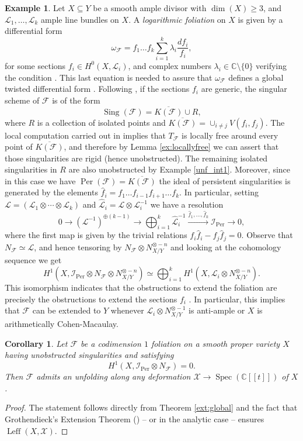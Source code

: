 \documentclass[reqno]{amsart}
\theoremstyle{plain}
\newcommand\C{\mathbb{C}}
\newcommand{\I}{\mathcal{I}}
\renewcommand{\I}{\mathcal{I}}
\renewcommand{\L}{\mathcal{L}}
\newcommand{\X}{\mathcal{X}}
\newcommand{\F}{\mathscr{F}}
\DeclareMathOperator{\Spec}{Spec}
\DeclareMathOperator{\Sing}{Sing}
\DeclareMathOperator{\Per}{Per}
\DeclareMathOperator{\Leff}{Leff}
\newcounter{Theorem}
\newtheorem{corollary}[theorem]{Corollary}
\theoremstyle{definition}
\newtheorem{example}[theorem]{Example}
\theoremstyle{named}
\begin{document}
\begin{example}
    Let $X\subseteq Y$ be a smooth ample divisor with $\dim(X)\geqslant 3$, and $\L_1,\dots, \L_k$ ample line bundles on $X$. A \emph{logarithmic foliation} on $X$ is given by a differential form
    $$ \omega_\F= f_1\dots f_k\sum_{i=1}^k \lambda_i \frac{df_i}{f_i},$$
    for some sections $f_i\in H^0(X,\L_i)$, and complex numbers $\lambda_i\in\C\setminus\{0\}$ verifying the condition \smash{$\sum_{i=1}^k \lambda_k c_1(\L_k) = 0$}. This last equation is needed to assure that $\omega_\F$ defines a global twisted differential form \cite[p. 752]{calvo1994irreducible}. Following \cite{cukierman2006singularities}, if the sections $f_i$ are generic, the singular scheme of $\F$ is  of the form 
    $$\Sing(\F)=\overline{K(\F)} \cup R,$$
    where $R$ is a collection of isolated points and $\overline{K(\F)}=\cup_{i\neq j} V(f_i,f_j)$.
    The local computation carried out in \cite[p. 134]{cukierman2006singularities} implies that $T_\F$ is locally free around every point of $\overline{K(\F)}$, and therefore by Lemma \ref{ex:locallyfree} we can assert that those singularities are rigid (hence unobstructed). The remaining isolated singularities in $R$ are also unobstructed by Example \ref{unf_int1}. Moreover, since in this case we have $\Per(\F)=\overline{K(\F)}$ the ideal of persistent singularities is generated by the elements $\widehat{f}_i=f_1\dots f_{i-1}f_{i+1}\dots f_k$. In particular, setting $\L=(\L_1\otimes \cdots \otimes \L_k)$ and $\widehat{\L}_i=\L\otimes \L_i^{-1}$ we have a resolution
    $$ 0 \rightarrow (\L^{-1})^{\oplus (k-1)} \longrightarrow \bigoplus_{i=1}^k \widehat{\L}_i^{ -1} \xrightarrow{\widehat{f}_1,\dots ,\widehat{f}_k} \I_{\Per} \rightarrow 0,  $$
    where the first map is given by the trivial relations $f_i\widehat{f}_i-f_j\widehat{f}_j=0$. Observe that $N_\F\simeq \L$, and hence tensoring by $N_\F\otimes N_{X/Y}^{\otimes -n}$ and looking at the cohomology sequence we get 
    $$H^1(X,\I_{\Per}\otimes N_\F\otimes N_{X/Y}^{\otimes -n} )\simeq \bigoplus_{i=1}^k H^1(X,\L_i\otimes N_{X/Y}^{\otimes -n}).$$
    This isomorphism indicates that the obstructions to extend the foliation are precisely the obstructions to extend the sections $f_i$ \cite[Prop. 3.3.4]{sernesi2007deformations}. In particular, this implies that $\F$ can be extended to $Y$ whenever $\L_i\otimes N_{X/Y}^{\otimes -1}$ is anti-ample or $X$ is arithmetically Cohen-Macaulay.
\end{example}


\begin{corollary} \label{cor:unfoldings}
    Let $\F$ be a codimension $1$ foliation on a smooth proper variety $X$ having unobstructed singularities and satisfying $$H^1(X,\I_{\Per}\otimes N_\F)=0.$$ Then $\F$ admits an unfolding along any deformation $\X\to \Spec(\C[[t]])$ of $X$. 
\end{corollary}
\begin{proof}
    The statement follows directly from Theorem \ref{ext:global} and the fact that Grothendieck's Extension Theorem (\cite[Theorem 5.1.4]{EGAIIIp1}) -- or \cite[Theorem 1.2]{kosarew1991grothendieck} in the analytic case -- ensures $\Leff(X,\X)$.
\end{proof}
\end{document}
